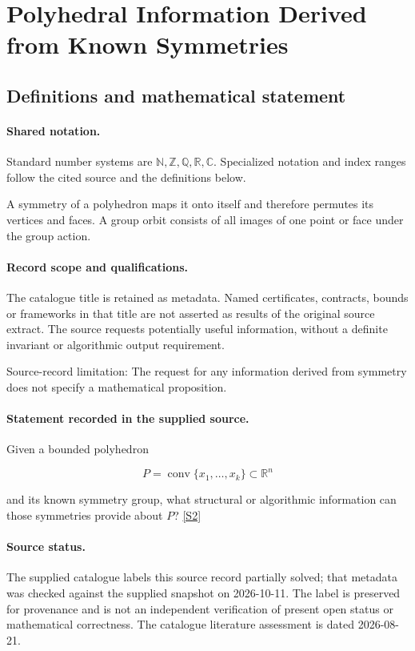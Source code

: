 \documentclass[11pt]{article}
\newcommand{\sref}[2]{\hyperlink{source:#1:#2}{[S#2]}}
\begin{document}
\section{Polyhedral Information Derived from Known Symmetries}\label{statement}

\subsection{Definitions and mathematical statement}

\paragraph{Shared notation.}Standard number systems are $\mathbb N,\mathbb Z,\mathbb Q,\mathbb R,\mathbb C$. Specialized notation and index ranges follow the cited source and the definitions below.


A symmetry of a polyhedron maps it onto itself and therefore permutes its vertices and faces. A group orbit consists of all images of one point or face under the group action.
\paragraph{Record scope and qualifications.}
The catalogue title is retained as metadata. Named certificates, contracts, bounds or frameworks in that title are not asserted as results of the original source extract.
The source requests potentially useful information, without a definite invariant or algorithmic output requirement.

Source-record limitation: The request for any information derived from symmetry does not specify a mathematical proposition.
\paragraph{Statement recorded in the supplied source.}
Given a bounded polyhedron

$$P=\operatorname{conv}\{x_1,\ldots,x_k\}\subset\mathbb R^n$$

and its known symmetry group, what structural or algorithmic information can those symmetries provide about $P$? \sref{statement}{2}
\paragraph{Source status.}
The supplied catalogue labels this source record partially solved; that metadata was checked against the supplied snapshot on 2026-10-11. The label is preserved for provenance and is not an independent verification of present open status or mathematical correctness. The catalogue literature assessment is dated 2026-08-21.
\end{document}
